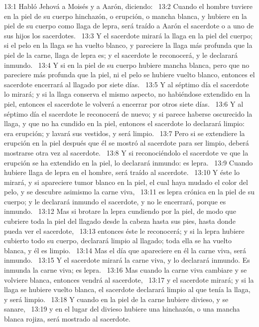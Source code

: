 13:1 Habló Jehová a Moisés y a Aarón, diciendo:  
13:2 Cuando el hombre tuviere en la piel de su cuerpo hinchazón, o erupción, o mancha blanca, y hubiere en la piel de su cuerpo como llaga de lepra, será traído a Aarón el sacerdote o a uno de sus hijos los sacerdotes.  
13:3 Y el sacerdote mirará la llaga en la piel del cuerpo; si el pelo en la llaga se ha vuelto blanco, y pareciere la llaga más profunda que la piel de la carne, llaga de lepra es; y el sacerdote le reconocerá, y le declarará inmundo.  
13:4 Y si en la piel de su cuerpo hubiere mancha blanca, pero que no pareciere más profunda que la piel, ni el pelo se hubiere vuelto blanco, entonces el sacerdote encerrará al llagado por siete días.  
13:5 Y al séptimo día el sacerdote lo mirará; y si la llaga conserva el mismo aspecto, no habiéndose extendido en la piel, entonces el sacerdote le volverá a encerrar por otros siete días.  
13:6 Y al séptimo día el sacerdote le reconocerá de nuevo; y si parece haberse oscurecido la llaga, y que no ha cundido en la piel, entonces el sacerdote lo declarará limpio: era erupción; y lavará sus vestidos, y será limpio.  
13:7 Pero si se extendiere la erupción en la piel después que él se mostró al sacerdote para ser limpio, deberá mostrarse otra vez al sacerdote.  
13:8 Y si reconociéndolo el sacerdote ve que la erupción se ha extendido en la piel, lo declarará inmundo: es lepra.  
13:9 Cuando hubiere llaga de lepra en el hombre, será traído al sacerdote.  
13:10 Y éste lo mirará, y si apareciere tumor blanco en la piel, el cual haya mudado el color del pelo, y se descubre asimismo la carne viva,  
13:11 es lepra crónica en la piel de su cuerpo; y le declarará inmundo el sacerdote, y no le encerrará, porque es inmundo.  
13:12 Mas si brotare la lepra cundiendo por la piel, de modo que cubriere toda la piel del llagado desde la cabeza hasta sus pies, hasta donde pueda ver el sacerdote,  
13:13 entonces éste le reconocerá; y si la lepra hubiere cubierto todo su cuerpo, declarará limpio al llagado; toda ella se ha vuelto blanca, y él es limpio.  
13:14 Mas el día que apareciere en él la carne viva, será inmundo.  
13:15 Y el sacerdote mirará la carne viva, y lo declarará inmundo. Es inmunda la carne viva; es lepra.  
13:16 Mas cuando la carne viva cambiare y se volviere blanca, entonces vendrá al sacerdote,  
13:17 y el sacerdote mirará; y si la llaga se hubiere vuelto blanca, el sacerdote declarará limpio al que tenía la llaga, y será limpio.  
13:18 Y cuando en la piel de la carne hubiere divieso, y se sanare,  
13:19 y en el lugar del divieso hubiere una hinchazón, o una mancha blanca rojiza, será mostrado al sacerdote.  
